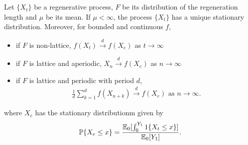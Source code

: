 \documentclass[all-lectures.tex]{subfiles}
\begin{document}

\setcounter{section}{5}
\setcounter{subsection}{0}

\section*{} %
{ \color{blue}
Let $\{X_t\}$ be a regenerative process, $F$ be its distribution of the regeneration length and $\mu$ be its mean. If $\mu < \infty$, the process $\{X_t\}$ has a unique stationary distribution. Moreover, for bounded and continuous $f$,
\begin{itemize}
\item if $F$ is non-lattice, $f(X_t) \stackrel{d}{\to} f(X_e)$ as $t \to  \infty$
\item if $F$ is lattice and aperiodic, $X_n \stackrel{d}{\to} f(X_e)$ as $n \to \infty$
\item if $F$ is lattice and periodic with period $d$, 
\begin{align*}
\frac{1}{d} \sum_{k=1}^d f(X_{n+k}) \stackrel{d}{\rightarrow} f(X_e) \text{ as } n \to \infty.
\end{align*}
\end{itemize}
\noindent where $X_e$ has the stationary distributionm given by 
\begin{align*}
\mathbb{P}\{X_e \leq x\} = \frac{\mathbb{E}_0[\int_0^{Y_1} 1\{X_t \leq x\}]}{\mathbb{E}_0[Y_1]}.
\end{align*}}
\end{document}
